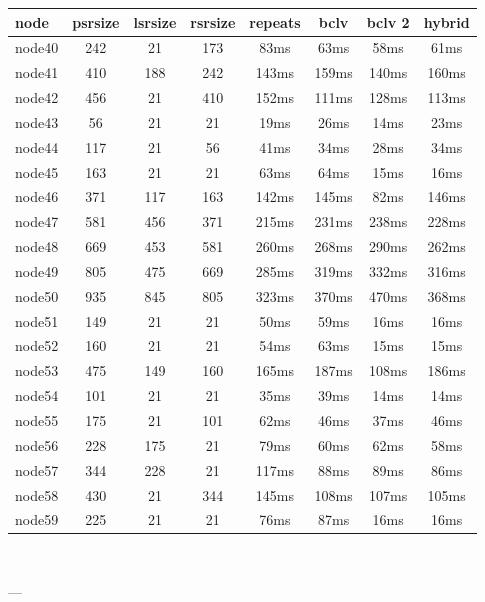 \begin{tabular}{|l|c|c|c|c|c|c|c|}
\hline node & psrsize & lsrsize & rsrsize   & repeats & bclv & bclv 2 & hybrid\\
    \hline node40 & 242 & 21 & 173 & 83ms & 63ms & 58ms & 61ms\\
    \hline node41 & 410 & 188 & 242 & 143ms & 159ms & 140ms & 160ms\\
    \hline node42 & 456 & 21 & 410 & 152ms & 111ms & 128ms & 113ms\\
    \hline node43 & 56 & 21 & 21 & 19ms & 26ms & 14ms & 23ms\\
    \hline node44 & 117 & 21 & 56 & 41ms & 34ms & 28ms & 34ms\\
    \hline node45 & 163 & 21 & 21 & 63ms & 64ms & 15ms & 16ms\\
    \hline node46 & 371 & 117 & 163 & 142ms & 145ms & 82ms & 146ms\\
    \hline node47 & 581 & 456 & 371 & 215ms & 231ms & 238ms & 228ms\\
    \hline node48 & 669 & 453 & 581 & 260ms & 268ms & 290ms & 262ms\\
    \hline node49 & 805 & 475 & 669 & 285ms & 319ms & 332ms & 316ms\\
    \hline node50 & 935 & 845 & 805 & 323ms & 370ms & 470ms & 368ms\\
    \hline node51 & 149 & 21 & 21 & 50ms & 59ms & 16ms & 16ms\\
    \hline node52 & 160 & 21 & 21 & 54ms & 63ms & 15ms & 15ms\\
    \hline node53 & 475 & 149 & 160 & 165ms & 187ms & 108ms & 186ms\\
    \hline node54 & 101 & 21 & 21 & 35ms & 39ms & 14ms & 14ms\\
    \hline node55 & 175 & 21 & 101 & 62ms & 46ms & 37ms & 46ms\\
    \hline node56 & 228 & 175 & 21 & 79ms & 60ms & 62ms & 58ms\\
    \hline node57 & 344 & 228 & 21 & 117ms & 88ms & 89ms & 86ms\\
    \hline node58 & 430 & 21 & 344 & 145ms & 108ms & 107ms & 105ms\\
    \hline node59 & 225 & 21 & 21 & 76ms & 87ms & 16ms & 16ms\\

\hline
\end{tabular} \

---


